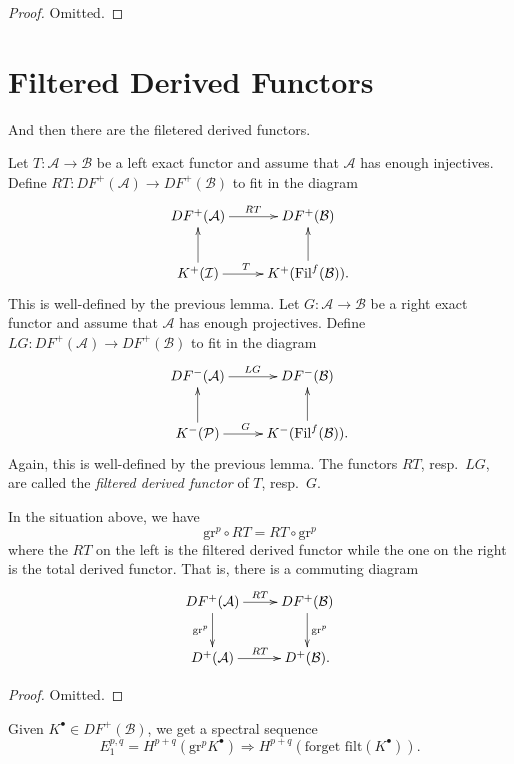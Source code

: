 \begin{proof}
Omitted.
\end{proof}





\section{Filtered Derived Functors}
\label{section-filtered-derived-functors}

\noindent
And then there are the filetered derived functors.

\begin{definition}
\label{definition-filtered-derived-functors}
Let $T: \mathcal{A} \to \mathcal{B}$ be a left exact functor and assume that
$\mathcal{A}$ has enough injectives. Define $RT: D F^+(\mathcal{A}) \to D
F^+(\mathcal{B})$ to fit in the diagram
$$
\xymatrix{
D F^+(\mathcal{A}) \ar^{RT}[r] & D F^+(\mathcal{B}) \\
K^+(\mathcal{I}) \ar[u] \ar[r]^{T \quad} & K^+(\text{Fil}^f(\mathcal{B})).
\ar[u]}
$$
This is well-defined by the previous lemma. Let $G: \mathcal{A} \to
\mathcal{B}$ be a right exact functor and assume that $\mathcal{A}$ has enough
projectives. Define $LG: D F^+(\mathcal{A}) \to D F^+(\mathcal{B})$ to fit in
the diagram
$$
\xymatrix{
D F^-(\mathcal{A}) \ar^{LG}[r] & D F^-(\mathcal{B}) \\
K^-(\mathcal{P}) \ar[u] \ar[r]^{G \quad} & K^-(\text{Fil}^f(\mathcal{B})).
\ar[u]}
$$
Again, this is well-defined by the previous lemma.
The functors $RT$, resp.\ $LG$, are called the {\it filtered derived
functor} of $T$, resp.\ $G$.
\end{definition}

\begin{proposition}
\label{proposition-compare-filtered-graded}
In the situation above, we have
$$
\mathrm{gr}^p \circ RT = RT \circ \mathrm{gr}^p
$$
where the $RT$ on the left is the filtered derived functor while the one on the
right is the total derived functor. That is, there is a commuting diagram
$$
\xymatrix{
D F^+(\mathcal{A}) \ar[r]^{RT} \ar[d]_{\text{gr}^p} & D F^+(\mathcal{B})
\ar[d]^{\text{gr}^p}\\
D^+(\mathcal{A}) \ar[r]^{RT} & D^+(\mathcal{B}).}
$$
\end{proposition}

\begin{proof}
Omitted.
\end{proof}

\noindent
Given $K^\bullet \in D F^+(\mathcal{B})$, we get a spectral sequence
$$
E_1^{p,q} = H^{p+q}(\text{gr}^p K^\bullet) \Rightarrow H^{p+q}(\text{forget
filt}(K^\bullet)).
$$






